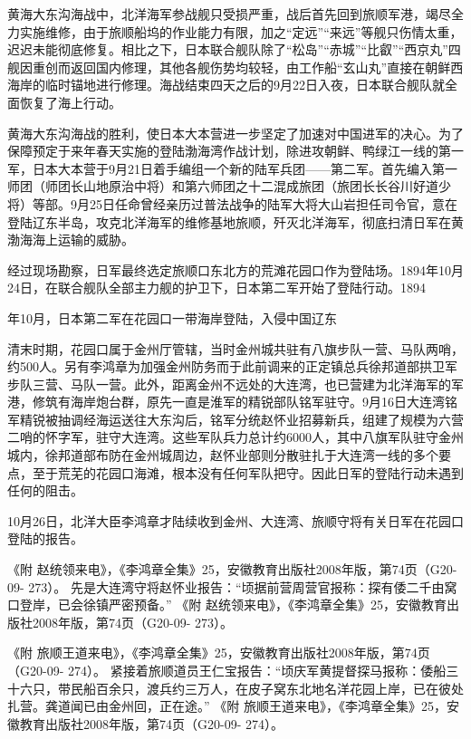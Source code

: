 \documentclass[12pt,UTF8]{ctexbook}
\begin{document}
黄海大东沟海战中，北洋海军参战舰只受损严重，战后首先回到旅顺军港，竭尽全力实施维修，由于旅顺船坞的作业能力有限，加之“定远”“来远”等舰只伤情太重，迟迟未能彻底修复。相比之下，日本联合舰队除了“松岛”“赤城”“比叡”“西京丸”四舰因重创而返回国内修理，其他各舰伤势均较轻，由工作船“玄山丸”直接在朝鲜西海岸的临时锚地进行修理。海战结束四天之后的9月22日入夜，日本联合舰队就全面恢复了海上行动。

黄海大东沟海战的胜利，使日本大本营进一步坚定了加速对中国进军的决心。为了保障预定于来年春天实施的登陆渤海湾作战计划，除进攻朝鲜、鸭绿江一线的第一军，日本大本营于9月21日着手编组一个新的陆军兵团——第二军。首先编入第一师团（师团长山地原治中将）和第六师团之十二混成旅团（旅团长长谷川好道少将）等部。9月25日任命曾经亲历过普法战争的陆军大将大山岩担任司令官，意在登陆辽东半岛，攻克北洋海军的维修基地旅顺，歼灭北洋海军，彻底扫清日军在黄渤海海上运输的威胁。

经过现场勘察，日军最终选定旅顺口东北方的荒滩花园口作为登陆场。1894年10月24日，在联合舰队全部主力舰的护卫下，日本第二军开始了登陆行动。1894


年10月，日本第二军在花园口一带海岸登陆，入侵中国辽东

清末时期，花园口属于金州厅管辖，当时金州城共驻有八旗步队一营、马队两哨，约500人。另有李鸿章为加强金州防务而于此前调来的正定镇总兵徐邦道部拱卫军步队三营、马队一营。此外，距离金州不远处的大连湾，也已营建为北洋海军的军港，修筑有海岸炮台群，原先一直是淮军的精锐部队铭军驻守。9月16日大连湾铭军精锐被抽调经海运送往大东沟后，铭军分统赵怀业招募新兵，组建了规模为六营二哨的怀字军，驻守大连湾。这些军队兵力总计约6000人，其中八旗军队驻守金州城内，徐邦道部布防在金州城周边，赵怀业部则分散驻扎于大连湾一线的多个要点，至于荒芜的花园口海滩，根本没有任何军队把守。因此日军的登陆行动未遇到任何的阻击。

10月26日，北洋大臣李鸿章才陆续收到金州、大连湾、旅顺守将有关日军在花园口登陆的报告。

《附 赵统领来电》，《李鸿章全集》25，安徽教育出版社2008年版，第74页（G20-09- 273）。
先是大连湾守将赵怀业报告：“顷据前营周营官报称：探有倭二千由窝口登岸，已会徐镇严密预备。” 《附 赵统领来电》，《李鸿章全集》25，安徽教育出版社2008年版，第74页（G20-09- 273）。

《附 旅顺王道来电》，《李鸿章全集》25，安徽教育出版社2008年版，第74页（G20-09- 274）。
紧接着旅顺道员王仁宝报告：“顷庆军黄提督探马报称：倭船三十六只，带民船百余只，渡兵约三万人，在皮子窝东北地名洋花园上岸，已在彼处扎营。龚道闻已由金州回，正在途。” 《附 旅顺王道来电》，《李鸿章全集》25，安徽教育出版社2008年版，第74页（G20-09- 274）。
\end{document}
